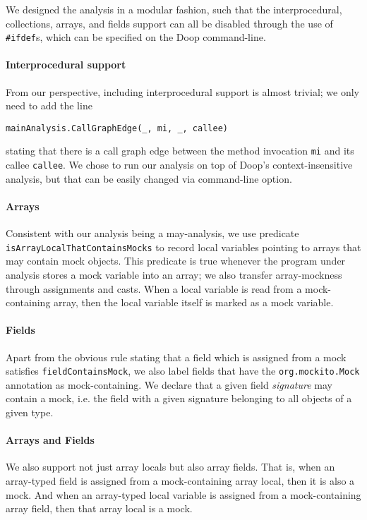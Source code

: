 We designed the analysis in a modular fashion, such that the interprocedural, collections, arrays, and fields support can all be disabled through the use of \verb+#ifdef+s, which can be specified on the Doop command-line.

\paragraph{Interprocedural support} From our perspective, including interprocedural support is almost trivial; we only need to add the line 
\begin{lstlisting}[basicstyle=\ttfamily\small,numbers=none]
  mainAnalysis.CallGraphEdge(_, mi, _, callee)
\end{lstlisting}
stating that there is a call graph edge between the method invocation {\tt mi} and its callee {\tt callee}. We chose to run our analysis on top of Doop's context-insensitive analysis, but that can be easily changed via command-line option.

\paragraph{Arrays} Consistent with our analysis being a may-analysis, we use predicate {\tt isArrayLocalThatContainsMocks} to record local variables pointing to arrays that may contain mock objects. This predicate is true whenever the program under analysis stores a mock variable into an array; we also transfer array-mockness through assignments and casts. When a local variable is read from a mock-containing array, then the local variable itself is marked as a mock variable.

\paragraph{Fields} Apart from the obvious rule stating that a field which is assigned from a mock satisfies {\tt fieldContainsMock}, we also label fields that have the {\tt org.mockito.Mock} annotation as mock-containing. We declare that a given field \emph{signature} may contain a mock, i.e. the field with a given signature belonging to all objects of a given type.

\paragraph{Arrays and Fields} We also support not just array locals but also array fields. That is, when an array-typed field is assigned from a mock-containing array local, then it is also a mock. And when an array-typed local variable is assigned from a mock-containing array field, then that array local is a mock.

